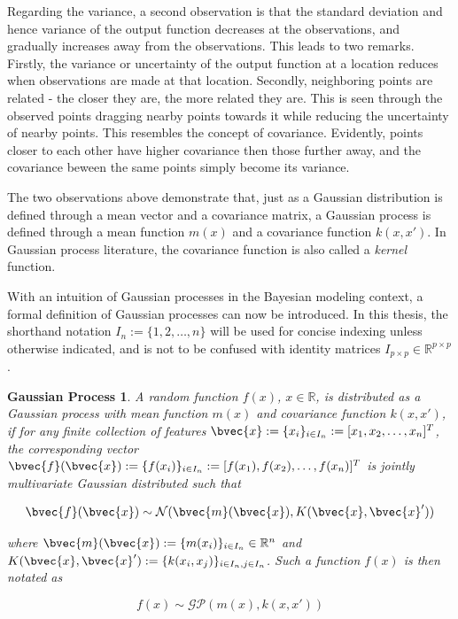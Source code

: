 			Regarding the variance, a second observation is that the standard deviation and hence variance of the output function decreases at the observations, and gradually increases away from the observations. This leads to two remarks. Firstly, the variance or uncertainty of the output function at a location reduces when observations are made at that location. Secondly, neighboring points are related - the closer they are, the more related they are. This is seen through the observed points dragging nearby points towards it while reducing the uncertainty of nearby points. This resembles the concept of covariance. Evidently, points closer to each other have higher covariance then those further away, and the covariance beween the same points simply become its variance.
			
			The two observations above demonstrate that, just as a Gaussian distribution is defined through a mean vector and a covariance matrix, a Gaussian process is defined through a mean function $m(x)$ and a covariance function $k(x, x')$. In Gaussian process literature, the covariance function is also called a \textit{kernel} function.
			
			With an intuition of Gaussian processes in the Bayesian modeling context, a formal definition of Gaussian processes can now be introduced. In this thesis, the shorthand notation $I_{n} := \{1, 2, \dots, n\}$ will be used for concise indexing unless otherwise indicated, and is not to be confused with identity matrices $I_{p \times p} \in \mathbb{R}^{p \times p}$.
			
			\newpage
			\newtheorem{gpdef}{Gaussian Process}[section]
			\begin{gpdef}
				A random function $f(x)$, $x \in \mathbb{R}$, is distributed as a Gaussian process with mean function $m(x)$ and covariance function $k(x, x')$, if for any finite collection of features $\bvec{x} := \{x_{i}\}_{i \in I_{n}} := [x_{1}, x_{2}, \dots, x_{n}]^{T}$, the corresponding vector $\bvec{f}(\bvec{x}) := \{f(x_{i})\}_{i \in I_{n}} := [f(x_{1}), f(x_{2}), \dots, f(x_{n})]^{T}$ is jointly multivariate Gaussian distributed such that 

					\begin{equation}
						\bvec{f}(\bvec{x}) \sim \mathcal{N}(\bvec{m}(\bvec{x}), K(\bvec{x}, \bvec{x}'))
					\label{Equation:GaussianProcessFiniteDistribution}
					\end{equation}	
				
				where $\bvec{m}(\bvec{x}) :=  \{m(x_{i})\}_{i \in I_{n}} \in \mathbb{R}^{n}$ and $K(\bvec{x}, \bvec{x}') := \{k(x_{i}, x_{j})\}_{i \in I_{n}, j \in I_{n}}$. Such a function $f(x)$ is then notated as
				
					\begin{equation}
						f(x) \sim \mathcal{GP}(m(x), k(x, x'))
					\label{Equation:GaussianProcess}
					\end{equation}	
					
			\label{Definition:GaussianProcess}
			\end{gpdef}
			
